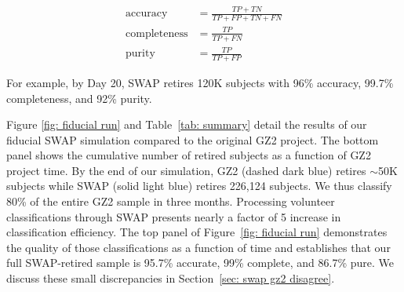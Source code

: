  \begin{align*}\label{eqn: metrics}
\mathrm{accuracy} &= \frac{TP + TN}{TP + FP + TN + FN} \\
\mathrm{completeness} &= \frac{TP}{TP +FN }\tag{3} \\
\mathrm{purity} &= \frac{TP}{TP + FP}
 \end{align*}

 For example, by Day 20, SWAP retires 120K subjects with 96\% accuracy, 99.7\% completeness, and 92\% purity. 
 
Figure \ref{fig: fiducial run} and Table~\ref{tab: summary} detail the results of our fiducial SWAP simulation compared to the original GZ2 project. The bottom panel shows the cumulative number of retired subjects as a function of GZ2 project time. By the end of our simulation, GZ2 (dashed dark blue) retires $\sim$50K subjects while SWAP (solid light blue) retires 226,124 subjects. We thus classify 80\% of the entire GZ2 sample in three months.  Processing volunteer classifications through SWAP presents nearly a factor of 5 increase in classification efficiency. The top panel of Figure~\ref{fig: fiducial run} demonstrates the quality of those classifications as a function of time and establishes that our full SWAP-retired sample is 95.7\% accurate, 99\% complete, and 86.7\% pure. We discuss these small discrepancies in Section~\ref{sec: swap gz2 disagree}.

